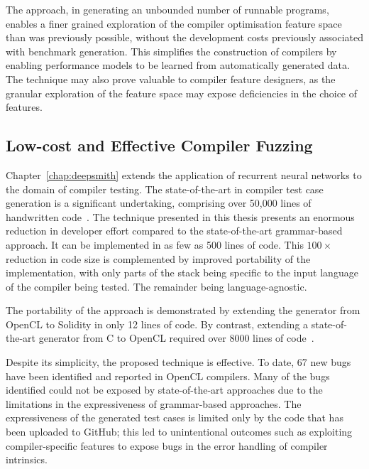 The approach, in generating an unbounded number of runnable programs, enables a finer grained exploration of the compiler optimisation feature space than was previously possible, without the development costs previously associated with benchmark generation. This simplifies the construction of compilers by enabling performance models to be learned from automatically generated data. The technique may also prove valuable to compiler feature designers, as the granular exploration of the feature space may expose deficiencies in the choice of features.



\subsection{Low-cost and Effective Compiler Fuzzing}

Chapter~\ref{chap:deepsmith} extends the application of recurrent neural networks to the domain of compiler testing. The state-of-the-art in compiler test case generation is a significant undertaking, comprising over 50,000 lines of handwritten code~\cite{Yang2011,Lidbury2015a}. The technique presented in this thesis presents an enormous reduction in developer effort compared to the state-of-the-art grammar-based approach. It can be implemented in as few as 500 lines of code. This $100\times$ reduction in code size is complemented by improved portability of the implementation, with only parts of the stack being specific to the input language of the compiler being tested. The remainder being language-agnostic.

The portability of the approach is demonstrated by extending the generator from OpenCL to Solidity in only 12 lines of code. By contrast, extending a state-of-the-art generator from C to OpenCL required over 8000 lines of code~\cite{Lidbury2015a}.

Despite its simplicity, the proposed technique is effective. To date, 67 new bugs have been identified and reported in OpenCL compilers. Many of the bugs identified could not be exposed by state-of-the-art approaches due to the limitations in the expressiveness of grammar-based approaches. The expressiveness of the generated test cases is limited only by the code that has been uploaded to GitHub; this led to unintentional outcomes such as exploiting compiler-specific features to expose bugs in the error handling of compiler intrinsics.


